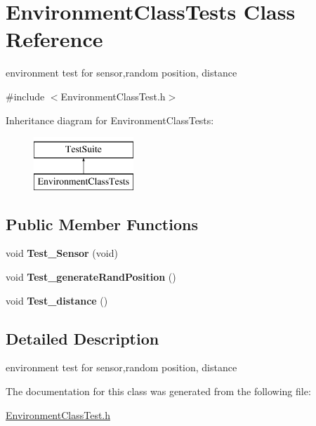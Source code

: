 \hypertarget{classEnvironmentClassTests}{\section{Environment\-Class\-Tests Class Reference}
\label{classEnvironmentClassTests}
}


environment test for sensor,random position, distance  




{\ttfamily \#include $<$Environment\-Class\-Test.\-h$>$}

Inheritance diagram for Environment\-Class\-Tests\-:\begin{figure}[H]
\begin{center}
\leavevmode
\includegraphics[height=2.000000cm]{classEnvironmentClassTests}
\end{center}
\end{figure}
\subsection*{Public Member Functions}
\begin{DoxyCompactItemize}
\item 
\hypertarget{classEnvironmentClassTests_a62b7cfcf9627301c2b9c54be419f4f42}{void {\bfseries Test\-\_\-\-Sensor} (void)}\label{classEnvironmentClassTests_a62b7cfcf9627301c2b9c54be419f4f42}

\item 
\hypertarget{classEnvironmentClassTests_acc3364a9b7ae1cfc4b02f26aa5595584}{void {\bfseries Test\-\_\-generate\-Rand\-Position} ()}\label{classEnvironmentClassTests_acc3364a9b7ae1cfc4b02f26aa5595584}

\item 
\hypertarget{classEnvironmentClassTests_a9dc861ce2b034e44fe2d3e2d7471fa47}{void {\bfseries Test\-\_\-distance} ()}\label{classEnvironmentClassTests_a9dc861ce2b034e44fe2d3e2d7471fa47}

\end{DoxyCompactItemize}


\subsection{Detailed Description}
environment test for sensor,random position, distance 

The documentation for this class was generated from the following file\-:\begin{DoxyCompactItemize}
\item 
\hyperlink{EnvironmentClassTest_8h}{Environment\-Class\-Test.\-h}\end{DoxyCompactItemize}
